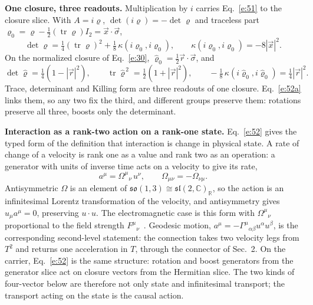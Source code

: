 \documentclass[10pt]{article}
\newcommand{\tr}{\operatorname{tr}}
\begin{document}
\smallskip
\noindent\textbf{One closure, three readouts.} Multiplication by $i$ carries Eq.~\eqref{e:51} to the closure slice. With $A=i\varrho$, $\det(i\varrho)=-\det\varrho$ and traceless part $\varrho_0=\varrho-\frac12(\tr\varrho)I_2=\vec x\cdot\vec\sigma$,
\begin{equation}
\det\varrho=\tfrac14(\tr\varrho)^2+\tfrac18\,\kappa(i\varrho_0,i\varrho_0),\qquad \kappa(i\varrho_0,i\varrho_0)=-8|\vec x|^2.\tag{51a}\label{e:52a}
\end{equation}
On the normalized closure of Eq.~\eqref{e:30}, $\widehat\varrho_0=\frac12\vec r\cdot\vec\sigma$, and
\begin{equation}
\det\widehat\varrho=\tfrac14(1-|\vec r|^2),\qquad \tr\widehat\varrho^{\,2}=\tfrac12(1+|\vec r|^2),\qquad -\tfrac18\,\kappa(i\widehat\varrho_0,i\widehat\varrho_0)=\tfrac14|\vec r|^2.\tag{51b}\label{e:52b}
\end{equation}
Trace, determinant and Killing form are three readouts of one closure. Eq.~\eqref{e:52a} links them, so any two fix the third, and different groups preserve them: rotations preserve all three, boosts only the determinant.

\smallskip
\noindent\textbf{Interaction as a rank-two action on a rank-one state.} Eq.~\eqref{e:52} gives the typed form of the definition that interaction is change in physical state. A rate of change of a velocity is rank one as a value and rank two as an operation: a generator with units of inverse time acts on a velocity to give its rate,
\begin{equation*}
a^\mu=\Omega^\mu{}_\nu\,u^\nu,\qquad \Omega_{\mu\nu}=-\Omega_{\nu\mu}.
\end{equation*}
Antisymmetric $\Omega$ is an element of $\mathfrak{so}(1,3)\cong\mathfrak{sl}(2,\mathbb C)_{\mathbb R}$, so the action is an infinitesimal Lorentz transformation of the velocity, and antisymmetry gives $u_\mu a^\mu=0$, preserving $u\cdot u$. The electromagnetic case is this form with $\Omega^\mu{}_\nu$ proportional to the field strength $F^\mu{}_\nu$~\cite{jackson}. Geodesic motion, $a^\mu=-\Gamma^\mu{}_{\alpha\beta}u^\alpha u^\beta$, is the corresponding second-level statement: the connection takes two velocity legs from $T^2$ and returns one acceleration in $T$, through the connector of Sec.~2. On the carrier, Eq.~\eqref{e:52} is the same structure: rotation and boost generators from the generator slice act on closure vectors from the Hermitian slice. The two kinds of four-vector below are therefore not only state and infinitesimal transport; the transport acting on the state is the causal action.
\end{document}

